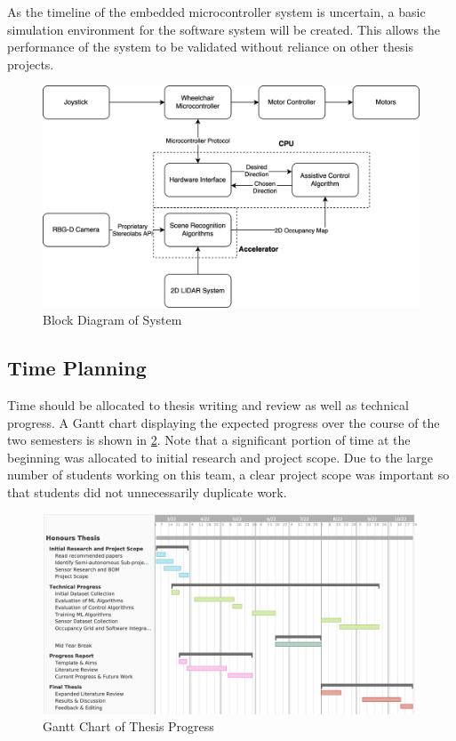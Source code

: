 \documentclass[12pt]{article}
\begin{document}
As the timeline of the embedded microcontroller system is uncertain, a basic simulation environment for the software system will be created.
This allows the performance of the system to be validated without reliance on other thesis projects.
\begin{figure}[H]
    \centering
    \includegraphics[width=0.7\linewidth]{images/block_diagram.png}
    \caption{Block Diagram of System}
    \label{fig:block_diagram}
\end{figure}

\subsection{Time Planning}
Time should be allocated to thesis writing and review as well as technical progress.
A Gantt chart displaying the expected progress over the course of the two semesters
is shown in \cref{fig:gantt_chart}. Note that a significant portion of time at the beginning was allocated
to initial research and project scope. Due to the large number of students working on this team,
a clear project scope was important so that students did not unnecessarily duplicate work.

\begin{figure}[H]
    \centering
    \includegraphics[width=0.9\linewidth]{images/gantt_chart.png}
    \caption{Gantt Chart of Thesis Progress}
    \label{fig:gantt_chart}
\end{figure}
\pagebreak
\end{document}
